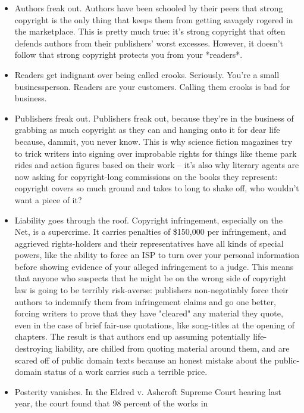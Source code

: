 \begin{itemize}
\item
  Authors freak out. Authors have been schooled by their peers that
  strong copyright is the only thing that keeps them from getting
  savagely rogered in the marketplace. This is pretty much true: it's
  strong copyright that often defends authors from their publishers'
  worst excesses. However, it doesn't follow that strong copyright
  protects you from your *readers*.
\item
  Readers get indignant over being called crooks. Seriously. You're a
  small businessperson. Readers are your customers. Calling them
  crooks is bad for business.
\item
  Publishers freak out. Publishers freak out, because they're in the
  business of grabbing as much copyright as they can and hanging onto
  it for dear life because, dammit, you never know. This is why
  science fiction magazines try to trick writers into signing over
  improbable rights for things like theme park rides and action
  figures based on their work -- it's also why literary agents are
  now asking for copyright-long commissions on the books they
  represent: copyright covers so much ground and takes to long to
  shake off, who wouldn't want a piece of it?
\item
  Liability goes through the roof. Copyright infringement, especially
  on the Net, is a supercrime. It carries penalties of \$150,000 per
  infringement, and aggrieved rights-holders and their
  representatives have all kinds of special powers, like the ability
  to force an ISP to turn over your personal information before
  showing evidence of your alleged infringement to a judge. This
  means that anyone who suspects that he might be on the wrong side
  of copyright law is going to be terribly risk-averse: publishers
  non-negotiably force their authors to indemnify them from
  infringement claims and go one better, forcing writers to prove
  that they have "cleared" any material they quote, even in the case
  of brief fair-use quotations, like song-titles at the opening of
  chapters. The result is that authors end up assuming potentially
  life-destroying liability, are chilled from quoting material around
  them, and are scared off of public domain texts because an honest
  mistake about the public-domain status of a work carries such a
  terrible price.
\item
  Posterity vanishes. In the Eldred v. Ashcroft Supreme Court hearing
  last year, the court found that 98 percent of the works in

\end{itemize}
